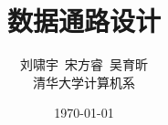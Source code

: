 \documentclass[10pt,a4paper]{article}
\begin{document}
\title{\huge 数据通路设计}
\author{\small 刘啸宇\ 宋方睿\ 吴育昕\\
	\small 清华大学计算机系}
\date{\small \today}
\maketitle
%

%
%
%
\appendix
%

\end{document}
